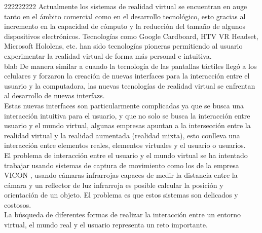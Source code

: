 222222222
Actualmente los sistemas de \gls{realidad virtual} se encuentran en auge tanto en el ámbito comercial como en el desarrollo tecnológico, esto gracias al incremento en la capacidad de cómputo y la reducción del tamaño de algunos dispositivos electrónicos. Tecnologías como Google Cardboard, HTV VR Headset, Microsoft Hololens, etc. han sido tecnologías pioneras permitiendo al usuario experimentar la realidad virtual de forma más personal e intuitiva.\\

blab
De manera similar a cuando la tecnología de las pantallas táctiles llegó a los celulares y forzaron la creación de nuevas interfaces para la interacción entre el usuario y la computadora, las nuevas tecnologías de realidad virtual se enfrentan al desarrollo de nuevas \glspl{interfaz}.\\

Estas nuevas interfaces son particularmente complicadas ya que se busca una interacción intuitiva para el usuario, y que no solo se busca la interacción entre usuario y el mundo virtual, algunas empresas apuntan a la intersección entre la realidad virtual y la realidad aumentada (realidad mixta), esto conlleva una interacción entre elementos reales, elementos virtuales y el usuario o usuarios.\\

El problema de interacción entre el usuario y el mundo virtual se ha intentado trabajar usando sistemas de captura de movimiento como los de la empresa VICON \cite{vicon}, usando cámaras infrarrojas capaces de medir la distancia entre la cámara y un reflector de luz infrarroja es posible calcular la posición y orientación de un objeto. El problema es que estos sistemas son delicados y costosos.\\

La búsqueda de diferentes formas de realizar la interacción entre un entorno virtual, el mundo real y el usuario representa un reto importante.\\



